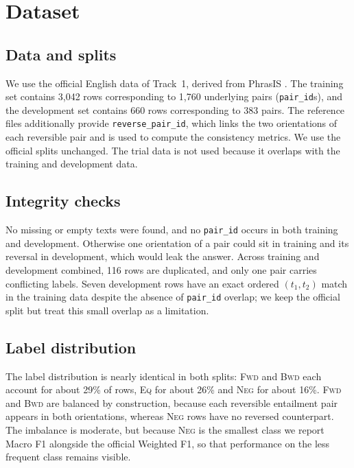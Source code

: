 \documentclass[11pt,a4paper]{article}
\newcommand{\EQ}{\textsc{Eq}}
\newcommand{\FWD}{\textsc{Fwd}}
\newcommand{\BWD}{\textsc{Bwd}}
\newcommand{\NEG}{\textsc{Neg}}
\begin{document}
\section{Dataset}
\label{sec:dataset}

\subsection{Data and splits}
We use the official English data of Track~1, derived from PhrasIS \citep{diconli2026}. The training set contains 3{,}042 rows corresponding to 1{,}760 underlying pairs (\texttt{pair\_id}s), and the development set contains 660 rows corresponding to 383 pairs. The reference files additionally provide \texttt{reverse\_pair\_id}, which links the two orientations of each reversible pair and is used to compute the consistency metrics. We use the official splits unchanged. The trial data is not used because it overlaps with the training and development data.

\subsection{Integrity checks}
No missing or empty texts were found, and no \texttt{pair\_id} occurs in both training and development. Otherwise one orientation of a pair could sit in training and its reversal in development, which would leak the answer. Across training and development combined, 116 rows are duplicated, and only one pair carries conflicting labels. Seven development rows have an exact ordered $(t_1,t_2)$ match in the training data despite the absence of \texttt{pair\_id} overlap; we keep the official split but treat this small overlap as a limitation.

\subsection{Label distribution}
The label distribution is nearly identical in both splits: \FWD{} and \BWD{} each account for about 29\% of rows, \EQ{} for about 26\% and \NEG{} for about 16\%. \FWD{} and \BWD{} are balanced by construction, because each reversible entailment pair appears in both orientations, whereas \NEG{} rows have no reversed counterpart. The imbalance is moderate, but because \NEG{} is the smallest class we report Macro F1 alongside the official Weighted F1, so that performance on the less frequent class remains visible.
\end{document}
